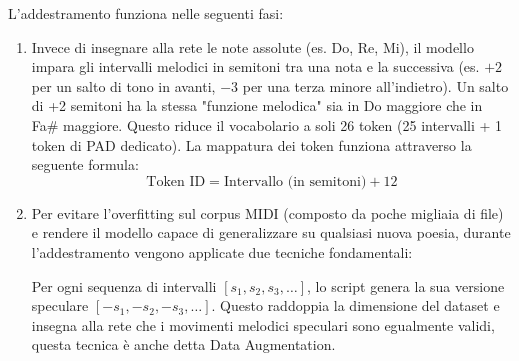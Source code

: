 L'addestramento funziona nelle seguenti fasi:
\begin{enumerate}
    \item Invece di insegnare alla rete le note assolute (es. Do, Re, Mi), il modello impara gli intervalli melodici in semitoni tra una nota e la successiva (es. $+2$ per un salto di tono in avanti, $-3$ per una terza minore all'indietro).
    Un salto di +2 semitoni ha la stessa "funzione melodica" sia in Do maggiore che in Fa\# maggiore. Questo riduce il vocabolario a soli 26 token (25 intervalli + 1 token di PAD dedicato).
    La mappatura dei token funziona attraverso la seguente formula:
    \[
    \text{Token ID} = \text{Intervallo (in semitoni)}+12
    \]
    \item Per evitare l'overfitting sul corpus MIDI (composto da poche migliaia di file) e rendere il modello capace di generalizzare su qualsiasi nuova poesia, durante l'addestramento vengono applicate due tecniche fondamentali:

    Per ogni sequenza di intervalli $[s_1, s_2, s_3, \dots]$, lo script genera la sua versione speculare $[-s_1, -s_2, -s_3, \dots]$. Questo raddoppia la dimensione del dataset e insegna alla rete che i movimenti melodici speculari sono egualmente validi, questa tecnica è anche detta Data Augmentation.


\end{enumerate}

